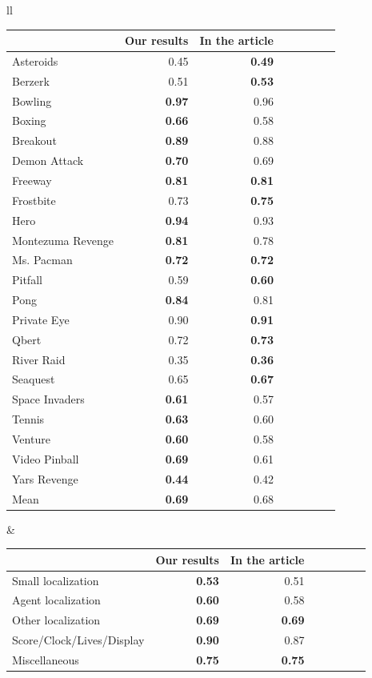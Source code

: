 \documentclass{article}
\begin{document}
\begin{table}[H]
\centering
\begin{tabular}{ll}
\begin{tabular}{lrrrrrrr}
\toprule
{} &  Our results & In the article \\
\midrule
Asteroids               &  0.45&  \textbf{0.49}\\
Berzerk               &  0.51&  \textbf{0.53}\\
Bowling               &  \textbf{0.97} &  0.96\\
Boxing               &  \textbf{0.66}&  0.58\\
Breakout               &  \textbf{0.89} &  0.88\\
Demon Attack               &  \textbf{0.70}&  0.69\\
Freeway               &  \textbf{0.81}&  \textbf{0.81}\\
Frostbite               &  0.73&  \textbf{0.75}\\
Hero               &  \textbf{0.94} &  0.93\\
Montezuma Revenge     &  \textbf{ 0.81}&  0.78\\
Ms. Pacman        &  \textbf{0.72}&  \textbf{0.72}\\
Pitfall              &  0.59&  \textbf{0.60}\\
Pong              &  \textbf{0.84}&  0.81\\
Private Eye              & 0.90 &  \textbf{0.91}\\
Qbert               &  0.72&  \textbf{0.73}\\
River Raid               &  0.35&  \textbf{0.36}\\
Seaquest               &  0.65&  \textbf{0.67}\\
Space Invaders        &  \textbf{0.61}&  0.57\\
Tennis               &  \textbf{0.63}&  0.60\\
Venture               &  \textbf{0.60}&  0.58\\
Video Pinball               &  \textbf{0.69}&  0.61\\
Yars Revenge               &  \textbf{0.44}&  0.42\\
\hline
Mean                &  \textbf{0.69}&  0.68\\
\bottomrule
\end{tabular}
&

\begin{tabular}{lrrrrrrr}
\toprule
{} &  Our results & In the article\\
\midrule
Small localization             &  \textbf{0.53}&  0.51\\
Agent localization        &  \textbf{0.60}&  0.58\\
Other localization      &  \textbf{0.69}&  \textbf{0.69}\\
Score/Clock/Lives/Display       &  \textbf{0.90}&  0.87\\
Miscellaneous       &  \textbf{0.75}&  \textbf{0.75}\\
\bottomrule
\end{tabular}


\end{tabular}
\end{table}
\end{document}
